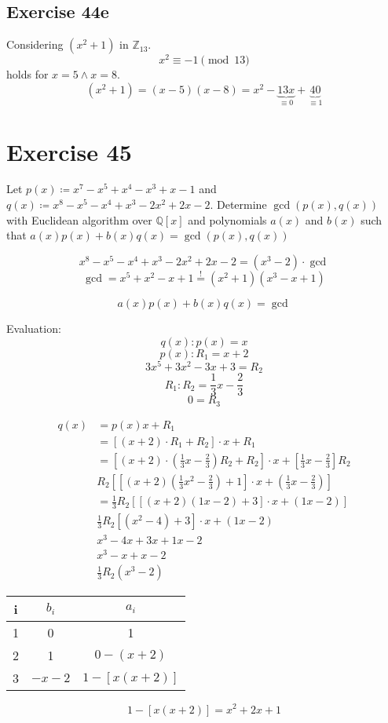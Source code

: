 \documentclass[a4paper]{article}
\theoremstyle{definition}
\begin{document}
\subsection{Exercise 44e}
Considering $(x^2+1)$ in $\mathbb Z_{13}$.
\[ x^2 \equiv -1 \pmod{13} \]
holds for $x = 5 \land x = 8$.
\[ (x^2 + 1) = (x - 5)(x - 8) = x^2 - \underbrace{13x}_{\equiv 0} + \underbrace{40}_{\equiv 1} \]

\section{Exercise 45}
\begin{ex}
  Let $p(x) \coloneqq x^7 - x^5 + x^4 - x^3 + x - 1$ and $q(x) \coloneqq x^8 - x^5 - x^4 + x^3 - 2x^2 + 2x - 2$.
  Determine $\operatorname{gcd}(p(x), q(x))$ with Euclidean algorithm over $\mathbb Q[x]$ and polynomials $a(x)$ and $b(x)$ such that $a(x) p(x) + b(x) q(x) = \operatorname{gcd}(p(x), q(x))$
\end{ex}

\[ x^8 - x^5 - x^4 + x^3 - 2x^2 + 2x - 2 = (x^3 - 2) \cdot \operatorname{gcd} \]
\[ \operatorname{gcd} = x^5 + x^2 - x + 1 \overset!= (x^2 + 1)(x^3 - x + 1) \]

\[ a(x) p(x) + b(x) q(x) = \operatorname{gcd} \]

Evaluation:
\[ q(x) : p(x) = x \]
\[ p(x) : R_1 = x+2 \]
\[ 3x^5 + 3x^2 - 3x + 3 = R_2 \]
\[ R_1 : R_2 = \frac13 x - \frac23 \]
\[ 0 = R_3 \]

\begin{align*}
  q(x) &= p(x) x + R_1 \\
    &= \left[(x + 2) \cdot R_1 + R_2\right] \cdot x + R_1 \\
    &= \left[(x + 2) \cdot \left(\frac13 x - \frac23\right) R_2 + R_2\right] \cdot x + \left[\frac13 x - \frac23\right] R_2 \\
    &R_2\left[\left[(x + 2) \left(\frac13 x^2 - \frac23\right) + 1\right] \cdot x + \left(\frac13 x - \frac23\right)\right] \\
    &= \frac13 R_2 \left[\left[(x + 2) (1x - 2) + 3\right] \cdot x + (1x - 2)\right] \\
    &\frac13 R_2 [(x^2 - 4) + 3] \cdot x + (1x - 2) \\
    &x^3 - 4x + 3x + 1x - 2 \\
    &x^3 - x + x - 2 \\
    &\frac13 R_2(x^3 - 2)
\end{align*}

\begin{center}
  \begin{tabular}{ccc}
    i & $b_i$  & $a_i$ \\
  \hline
    1 & 0      & 1 \\
    2 & 1      & $0 - (x + 2)$ \\
    3 & $-x-2$ & $1 - [x (x + 2)]$
  \end{tabular}
\end{center}
\[ 1 - [x (x + 2)] = x^2 + 2x + 1 \]
\end{document}
